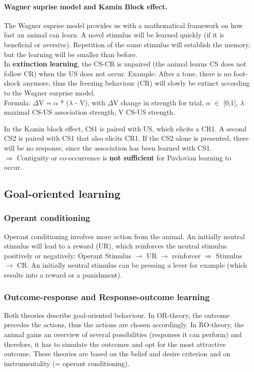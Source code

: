 \documentclass[twosided, a4paper, pt11]{article}
\begin{document}
	
	\paragraph{Wagner suprise model and Kamin Block effect.}
	The Wagner suprise model provides us with a mathematical framework on how fast an animal can learn. A novel stimulus will be learned quickly (if it is beneficial or aversive). Repetition of the same stimulus will establish the memory, but the learning will be smaller than before.\\
	In \textbf{extinction learning}, the CS-CR is unpaired (the animal learns CS does not follow CR) when the US does not occur. Example: After a tone, there is no foot-shock anymore, thus the freezing behaviour (CR) will slowly be extinct according to the Wagner surprise model.\\
	Formula: $\Delta$V = $\alpha$ * ($\lambda$ - V), with $\Delta$V change in strength for trial, $\alpha$ $\in$ [0,1], $\lambda$ maximal CS-US association strength, V CS-US strength.\newline
	
	In the Kamin block effect, CS1 is paired with US, which elicits a CR1. A second CS2 is paired with CS1 that also elicits CR1. If the CS2 alone is presented, there will be no response, since the association has been learned with CS1.\\
	$\Rightarrow$ Contiguity or co-occurrence is \textbf{not sufficient} for Pavlovian learning to occur.
	
	\subsection{Goal-oriented learning}
	
	\subsubsection{Operant conditioning}
	Operant conditioning involves more action from the animal. An initially neutral stimulus will lead to a reward (UR), which reinforces the neutral stimulus positively or negatively: Operant Stimulus $\rightarrow$ UR $\rightarrow$ reinforcer $\Rightarrow$ Stimulus $\rightarrow$ CR. An initially neutral stimulus can be pressing a lever for example (which results into a reward or a punishment).
	
	\subsubsection{Outcome-response and Response-outcome learning}
	Both theories describe goal-oriented behaviour. In OR-theory, the outcome precedes the actions, thus the actions are chosen accordingly. In RO-theory, the animal gains an overview of several possibilities (responses it can perform) and therefore, it has to simulate the outcomes and opt for the most attractive outcome. These theories are based on the belief and desire criterion and on instrumentality (= operant conditioning).
	
\end{document}
